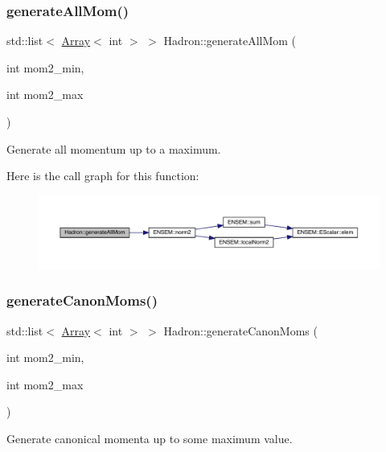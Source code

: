 \subsubsection{\texorpdfstring{generateAllMom()}{generateAllMom()}}
{\footnotesize\ttfamily std\+::list$<$ \mbox{\hyperlink{classXMLArray_1_1Array}{Array}}$<$ int $>$ $>$ Hadron\+::generate\+All\+Mom (\begin{DoxyParamCaption}\item[{int}]{mom2\+\_\+min,  }\item[{int}]{mom2\+\_\+max }\end{DoxyParamCaption})}



Generate all momentum up to a maximum. 

Here is the call graph for this function\+:
\nopagebreak
\begin{figure}[H]
\begin{center}
\leavevmode
\includegraphics[width=350pt]{d1/daf/namespaceHadron_aa0ad60c011c7668c5389ce9286b3c8dd_cgraph}
\end{center}
\end{figure}
\mbox{\label{namespaceHadron_af42e0a1c54e10b67abac83c56c67b40e}} 
\subsubsection{\texorpdfstring{generateCanonMoms()}{generateCanonMoms()}}
{\footnotesize\ttfamily std\+::list$<$ \mbox{\hyperlink{classXMLArray_1_1Array}{Array}}$<$ int $>$ $>$ Hadron\+::generate\+Canon\+Moms (\begin{DoxyParamCaption}\item[{int}]{mom2\+\_\+min,  }\item[{int}]{mom2\+\_\+max }\end{DoxyParamCaption})}



Generate canonical momenta up to some maximum value. 

